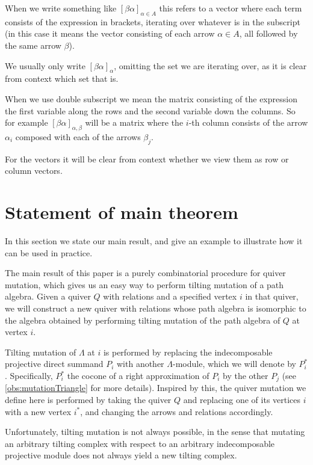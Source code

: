 \documentclass[12pt, dvipsnames, oneside]{amsart}
\theoremstyle{definition}
\begin{document}
\smallskip

When we write something like $[\beta\alpha]_{\alpha\in A}$ this refers to a vector where each term consists of the expression in brackets, iterating over whatever is in the subscript (in this case it means the vector consisting of each arrow $\alpha\in A$, all followed by the same arrow $\beta$). 

We usually only write $[\beta\alpha]_{\alpha}$, omitting the set we are iterating over, as it is clear from context which set that is.

When we use double subscript we mean the matrix consisting of the expression the first variable along the rows and the second variable down the columns. So for example $[\beta\alpha]_{\alpha,\beta}$ will be a matrix where the $i$-th column consists of the arrow $\alpha_i$ composed with each of the arrows $\beta_j$. 

For the vectors it will be clear from context whether we view them as row or column vectors.




\section{Statement of main theorem}\label{section:mutationsteps}
In this section we state our main result, and give an example to illustrate how it can be used in practice.

The main result of this paper is a purely combinatorial procedure for quiver mutation, which gives us an easy way to perform tilting mutation of a path algebra. Given a quiver $Q$ with relations and a specified vertex $i$ in that quiver, we will construct a new quiver with relations whose path algebra is isomorphic to the algebra obtained by performing tilting mutation of the path algebra of $Q$ at vertex $i$. 

Tilting mutation of $\Lambda$ at $i$ is performed by replacing the indecomposable projective direct summand $P_i$ with another $\Lambda$-module, which we will denote by $P_i^*$. Specifically, $P_i^*$ the cocone of a right approximation of $P_i$ by the other $P_j$ (see \cref{obs:mutationTriangle} for more details).
Inspired by this, the quiver mutation we define here is performed by taking the quiver $Q$ and replacing one of its vertices $i$ with a new vertex $i^*$, and changing the arrows and relations accordingly.

\medskip

Unfortunately, tilting mutation is not always possible, in the sense that mutating an arbitrary tilting complex with respect to an arbitrary indecomposable projective module does not always yield a new tilting complex.
\end{document}
